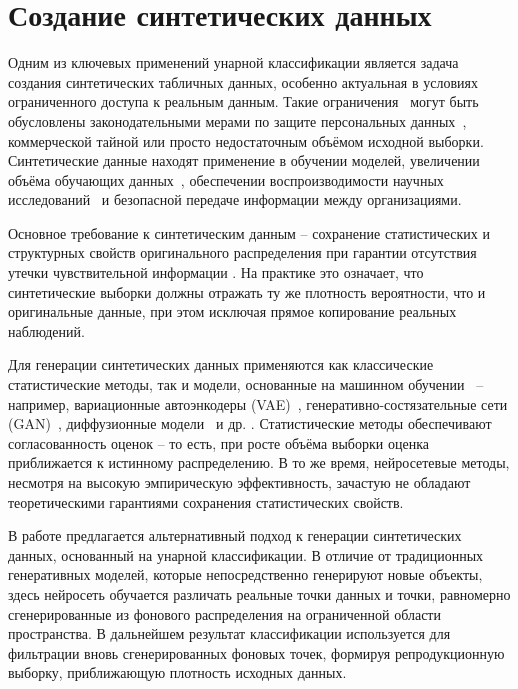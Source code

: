 \section{Создание синтетических данных}

Одним из ключевых применений унарной классификации является задача создания синтетических табличных данных, особенно актуальная в условиях ограниченного доступа к реальным данным. Такие ограничения~\cite{gal2023synthetic} могут быть обусловлены законодательными мерами по защите персональных данных~\cite{joshi2024synthetic}, коммерческой тайной или просто недостаточным объёмом исходной выборки. Синтетические данные находят применение в обучении моделей, увеличении объёма обучающих данных~\cite{belyaeva2020synthetic}, обеспечении воспроизводимости научных исследований~\cite{grund2022using} и безопасной передаче информации между организациями.

Основное требование к синтетическим данным -- сохранение статистических и структурных свойств оригинального распределения при гарантии отсутствия утечки чувствительной информации \cite{bauer2024comprehensive}. На практике это означает, что синтетические выборки должны отражать ту же плотность вероятности, что и оригинальные данные, при этом исключая прямое копирование реальных наблюдений.

Для генерации синтетических данных применяются как классические статистические методы, так и модели, основанные на машинном обучении~\cite{figueira2022survey} -- например, вариационные автоэнкодеры (VAE)~\cite{wan2017variational}, генеративно-состязательные сети (GAN)~\cite{jordon2018pate}, диффузионные модели~\cite{villaizan2024diffusion} и др. \cite{akkem2024comprehensive}. Статистические методы обеспечивают согласованность оценок -- то есть, при росте объёма выборки оценка приближается к истинному распределению. В то же время, нейросетевые методы, несмотря на высокую эмпирическую эффективность, зачастую не обладают теоретическими гарантиями сохранения статистических свойств.

В работе \cite{synthetic2025unary} предлагается альтернативный подход к генерации синтетических данных, основанный на унарной классификации. В отличие от традиционных генеративных моделей, которые непосредственно генерируют новые объекты, здесь нейросеть обучается различать реальные точки данных и точки, равномерно сгенерированные из фонового распределения на ограниченной области пространства. В дальнейшем результат классификации используется для фильтрации вновь сгенерированных фоновых точек, формируя репродукционную выборку, приближающую плотность исходных данных.


